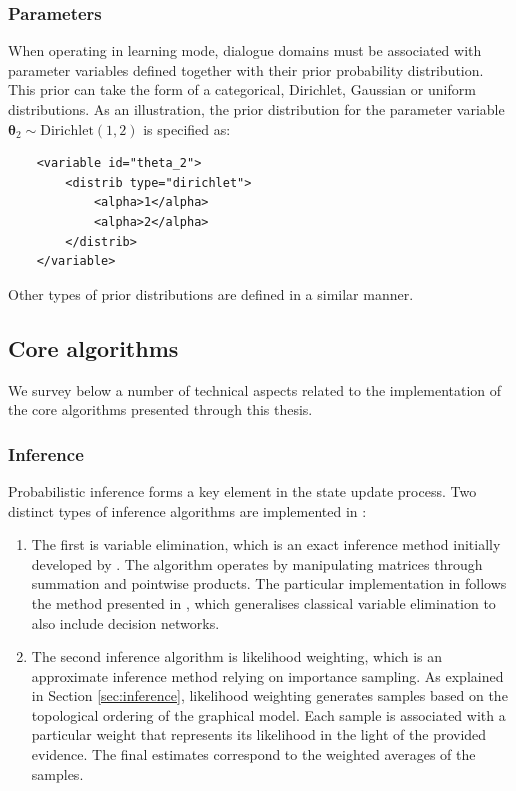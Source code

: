\subsubsection*{Parameters}

When operating in learning mode, dialogue domains must be associated with parameter variables defined together with their prior probability distribution.  This prior can take the form of a categorical, Dirichlet, Gaussian or uniform distributions.  As an illustration, the prior distribution for the parameter variable $\boldsymbol\theta_2 \sim \mathrm{Dirichlet}(1,2)$ is specified as: 

\vspace{3mm}\begin{lstlisting}
    <variable id="theta_2">
        <distrib type="dirichlet">
            <alpha>1</alpha>
            <alpha>2</alpha>
        </distrib>
    </variable>
\end{lstlisting}\vspace{2mm}

Other types of prior distributions are defined in a similar manner. 

\subsection{Core algorithms}
\label{sec:corealgorithms}

We survey below a number of technical aspects related to the \opendial{} implementation of the core algorithms presented through this thesis.  

\subsubsection*{Inference}

Probabilistic inference forms a key element in the state update process.  Two distinct types of inference algorithms are implemented in \opendial{}: \begin{enumerate}
\item The first is variable elimination, which is an exact inference method initially developed by \cite{ZhangP96}.  The algorithm operates by manipulating matrices through summation and pointwise products. The particular implementation in \opendial{} follows the method presented in \cite[][p. 1101]{Koller+Friedman:09}, which generalises classical variable elimination to also include decision networks.
\item The second inference algorithm is likelihood weighting, which is an approximate inference method relying on importance sampling. As explained in Section \ref{sec:inference}, likelihood weighting generates samples based on the topological ordering of the graphical model. Each sample is associated with a particular weight that represents its likelihood in the light of the provided evidence.  The final estimates correspond to the weighted averages of the samples. 
\end{enumerate}

